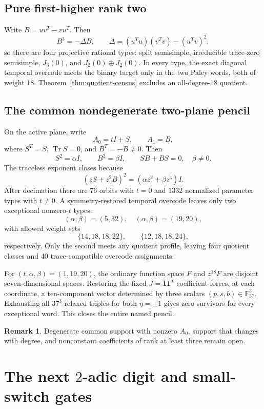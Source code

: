\documentclass[11pt]{article}
\theoremstyle{definition}
\newtheorem{remark}[theorem]{Remark}
\newcommand{\F}{\mathbb{F}}
\newcommand{\Tr}{\operatorname{Tr}}
\newcommand{\one}{\mathbf{1}}
\begin{document}
\subsection{Pure first-higher rank two}

Write \(B=uv^T-vu^T\).  Then
\[
B^3=-\Delta B,\qquad
\Delta=(u^Tu)(v^Tv)-(u^Tv)^2,
\]
so there are four projective rational types: split semisimple,
irreducible trace-zero semisimple, \(J_3(0)\), and
\(J_2(0)\oplus J_2(0)\).  In every type, the exact diagonal temporal
overcode meets the binary target only in the two Paley words, both of
weight \(18\).  Theorem~\ref{thm:quotient-census} excludes an all-degree-18
quotient.

\subsection{The common nondegenerate two-plane pencil}

On the active plane, write
\[
A_0=tI+S,\qquad A_1=B,
\]
where \(S^T=S\), \(\Tr S=0\), and \(B^T=-B\neq0\).  Then
\[
S^2=\alpha I,\qquad B^2=\beta I,\qquad SB+BS=0,
\quad\beta\neq0.
\tag{9.3}\label{eq:two-plane-relations}
\]
The traceless exponent closes because
\[
(zS+z^2B)^2=(\alpha z^2+\beta z^4)I.
\tag{9.4}\label{eq:two-plane-square}
\]
After decimation there are \(76\) orbits with \(t=0\) and \(1332\)
normalized parameter types with \(t\neq0\).  A symmetry-restored temporal
overcode leaves only two exceptional nonzero-\(t\) types:
\[
(\alpha,\beta)=(5,32),\quad
(\alpha,\beta)=(19,20),
\]
with allowed weight sets
\[
\{14,18,18,22\},
\qquad
\{12,18,18,24\},
\]
respectively.  Only the second meets any quotient profile, leaving four
quotient classes and \(40\) trace-compatible overcode assignments.

For \((t,\alpha,\beta)=(1,19,20)\), the ordinary function space \(F\)
and \(z^{18}F\) are disjoint seven-dimensional spaces.  Restoring the
fixed \(J=\one\one^T\) coefficient forces, at each coordinate, a
ten-component vector determined by three scalars
\((p,s,b)\in\F_{37}^3\).  Exhausting all \(37^3\) relaxed triples for
both \(\eta=\pm1\) gives zero survivors for every exceptional word.  This
closes the entire named pencil.

\begin{remark}
Degenerate common support with nonzero \(A_0\), support that changes with
degree, and nonconstant coefficients of rank at least three remain open.
\end{remark}

\section{The next \texorpdfstring{\(2\)}{2}-adic digit and small-switch gates}
\label{sec:switches}
\end{document}
